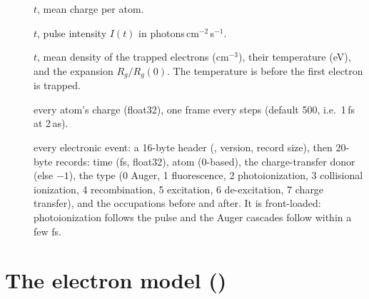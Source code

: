 \begin{description}
  \item[] $t$, mean charge per atom.
  \item[] $t$, pulse intensity $I(t)$ in photons\,cm$^{-2}$\,s$^{-1}$.
  \item[] $t$, mean density of the trapped electrons (cm$^{-3}$), their temperature (eV), and
    the expansion $R_g/R_g(0)$.
    The temperature is  before the first electron is trapped.
  \item[] every atom's charge (float32), one frame every
     steps (default 500, i.e.\ 1\,fs at 2\,as).
  \item[] every electronic event: a 16-byte header (, version, record size), then
    20-byte records: time (fs, float32), atom (0-based), the charge-transfer donor (else $-1$), the type (0 Auger,
    1 fluorescence, 2 photoionization, 3 collisional ionization, 4 recombination, 5 excitation, 6 de-excitation,
    7 charge transfer), and the  occupations before and after.
    It is front-loaded: photoionization follows the pulse and the Auger cascades follow within a few fs.
\end{description}

\section{The electron model ()}

